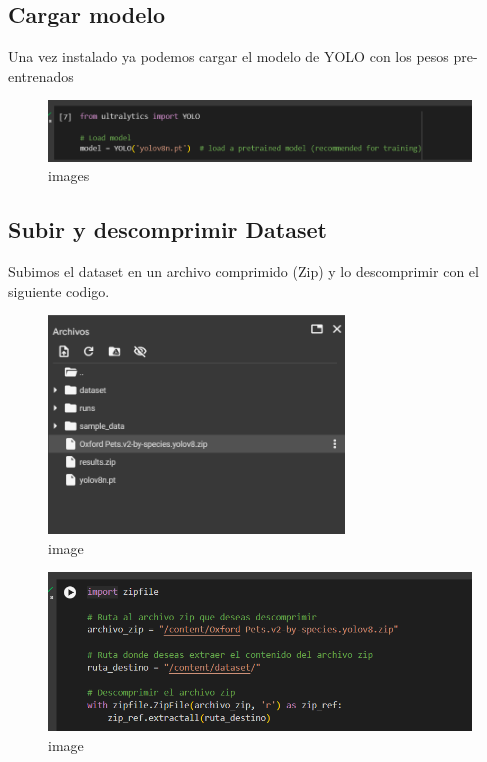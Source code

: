 \documentclass[11pt]{article}
\begin{document}
    \subsection{Cargar modelo}\label{cargar-modelo}

    Una vez instalado ya podemos cargar el modelo de YOLO con los pesos
pre-entrenados

    \begin{figure}
\centering
\includegraphics{imgs/Cargamos el modelo.png}
\caption{images}
\end{figure}

    \subsection{Subir y descomprimir
Dataset}\label{subir-y-descomprimir-dataset}

    Subimos el dataset en un archivo comprimido (Zip) y lo descomprimir con
el siguiente codigo.

    \begin{figure}
\centering
\includegraphics[width=0.7\textwidth]{imgs/Subimos el dataset para entrenar el modelo.png}
\caption{image}
\end{figure}

    \begin{figure}
\centering
\includegraphics{imgs/Lo descomprimimos .png}
\caption{image}
\end{figure}
\end{document}
